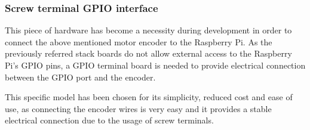 \subsubsection{Screw terminal GPIO interface}
This piece of hardware has become a necessity during development in order to connect the above mentioned motor encoder to the Raspberry Pi.
As the previously referred stack boards do not allow external access to the Raspberry Pi's GPIO pins, a GPIO terminal board is needed to provide electrical connection between the GPIO port and the encoder.

This specific model has been chosen for its simplicity, reduced cost and ease of use, as connecting the encoder wires is very easy and it provides a stable electrical connection due to the usage of screw terminals.
